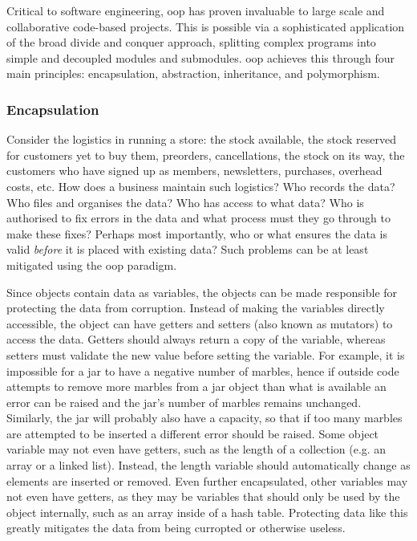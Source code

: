 \documentclass[11pt]{article}
\begin{document}
Critical to software engineering, \acrfull{oop} has proven invaluable to large scale and collaborative code-based projects. This is possible via a sophisticated application of the broad divide and conquer approach, splitting complex programs into simple and decoupled modules and submodules. \acrshort{oop} achieves this through four main principles: \gls{encapsulation}, \gls{abstraction}, \gls{inheritance}, and \gls{polymorphism}.

\subsubsection{Encapsulation}

Consider the logistics in running a store: the stock available, the stock reserved for customers yet to buy them, preorders, cancellations, the stock on its way, the customers who have signed up as members, newsletters, purchases, overhead costs, etc. How does a business maintain such logistics? Who records the data? Who files and organises the data? Who has access to what data? Who is authorised to fix errors in the data and what process must they go through to make these fixes? Perhaps most importantly, who or what ensures the data is valid \textit{before} it is placed with existing data? Such problems can be at least mitigated using the \acrshort{oop} paradigm.

Since \glspl{object} contain data as variables, the \glspl{object} can be made responsible for protecting the data from corruption. Instead of making the variables directly accessible, the \gls{object} can have getters and setters (also known as mutators) to access the data. Getters should always return a copy of the variable, whereas setters must validate the new value before setting the variable. For example, it is impossible for a jar to have a negative number of marbles, hence if outside code attempts to remove more marbles from a jar \gls{object} than what is available an error can be raised and the jar's number of marbles remains unchanged. Similarly, the jar will probably also have a capacity, so that if too many marbles are attempted to be inserted a different error should be raised. Some \gls{object} variable may not even have getters, such as the length of a collection (e.g. an \gls{array} or a linked list). Instead, the length variable should automatically change as elements are inserted or removed. Even further encapsulated, other variables may not even have getters, as they may be variables that should only be used by the \gls{object} internally, such as an \gls{array} inside of a hash table. Protecting data like this greatly mitigates the data from being curropted or otherwise useless.
\end{document}
